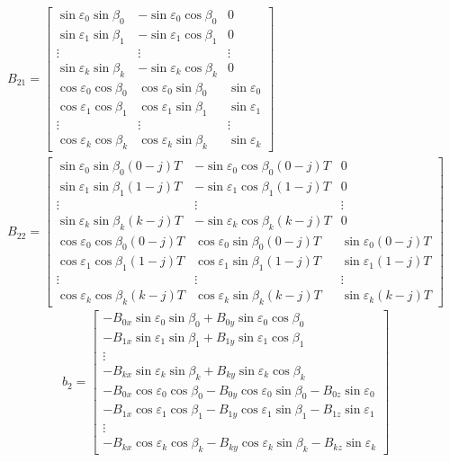 \begin{equation}
	\begin{array}{c}
		B_{21} = \left[\begin{array}{ccc}
			\sin\varepsilon_0\sin\beta_0 & -\sin\varepsilon_0\cos\beta_0 & 0 \\
			\sin\varepsilon_1\sin\beta_1 & -\sin\varepsilon_1\cos\beta_1 & 0 \\
			\vdots & \vdots & \vdots \\
			\sin\varepsilon_k\sin\beta_k & -\sin\varepsilon_k\cos\beta_k & 0 \\ \hline
			\cos\varepsilon_0\cos\beta_0 & \cos\varepsilon_0\sin\beta_0 & \sin\varepsilon_0 \\ 
			\cos\varepsilon_1\cos\beta_1 & \cos\varepsilon_1\sin\beta_1 & \sin\varepsilon_1 \\ 
			\vdots & \vdots & \vdots \\
			\cos\varepsilon_k\cos\beta_k & \cos\varepsilon_k\sin\beta_k & \sin\varepsilon_k 
		\end{array}\right] \\
		B_{22} = \left[\begin{array}{ccc}
			\sin\varepsilon_0\sin\beta_0(0-j)T & -\sin\varepsilon_0\cos\beta_0(0-j)T & 0 \\
			\sin\varepsilon_1\sin\beta_1(1-j)T & -\sin\varepsilon_1\cos\beta_1(1-j)T & 0 \\
			\vdots & \vdots & \vdots \\
			\sin\varepsilon_k\sin\beta_k(k-j)T & -\sin\varepsilon_k\cos\beta_k(k-j)T & 0 \\ \hline
			\cos\varepsilon_0\cos\beta_0(0-j)T & \cos\varepsilon_0\sin\beta_0(0-j)T & \sin\varepsilon_0(0-j)T \\ 
			\cos\varepsilon_1\cos\beta_1(1-j)T & \cos\varepsilon_1\sin\beta_1(1-j)T & \sin\varepsilon_1(1-j)T \\ 
			\vdots & \vdots & \vdots \\
			\cos\varepsilon_k\cos\beta_k(k-j)T & \cos\varepsilon_k\sin\beta_k(k-j)T & \sin\varepsilon_k(k-j)T 
		\end{array}\right]
	\end{array}
\end{equation}
\begin{equation}
	b_2 = \left[\begin{array}{c}
		-B_{0x}\sin\varepsilon_0\sin\beta_0 + B_{0y}\sin\varepsilon_0\cos\beta_0 \\
		-B_{1x}\sin\varepsilon_1\sin\beta_1 + B_{1y}\sin\varepsilon_1\cos\beta_1 \\
		\vdots \\
		-B_{kx}\sin\varepsilon_k\sin\beta_k + B_{ky}\sin\varepsilon_k\cos\beta_k \\ \hline
		-B_{0x}\cos\varepsilon_0\cos\beta_0 -B_{0y}\cos\varepsilon_0\sin\beta_0 -B_{0z}\sin\varepsilon_0 \\
		-B_{1x}\cos\varepsilon_1\cos\beta_1 -B_{1y}\cos\varepsilon_1\sin\beta_1 -B_{1z}\sin\varepsilon_1 \\
		\vdots \\
		-B_{kx}\cos\varepsilon_k\cos\beta_k -B_{ky}\cos\varepsilon_k\sin\beta_k -B_{kz}\sin\varepsilon_k
	\end{array}\right]
\end{equation}
